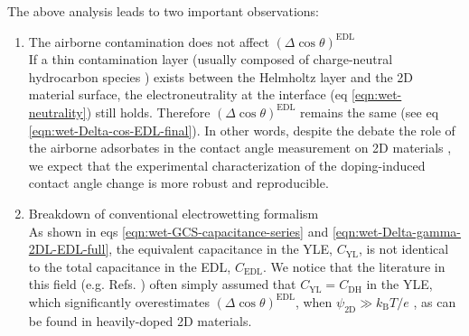 The above analysis leads to two important observations:
\begin{enumerate}
\item The airborne contamination does not affect \((\Delta \cos
  \theta)^{\mathrm{EDL}}\) \\
  If a thin
contamination layer (usually composed of charge-neutral hydrocarbon
species \cite{li_2013_airborne}) exists between the Helmholtz layer and
the 2D material surface, the electroneutrality at the interface (eq
\autoref{eqn:wet-neutrality}) still holds. Therefore \((\Delta \cos
\theta)^{\mathrm{EDL}}\) remains the same (see eq
\autoref{eqn:wet-Delta-cos-EDL-final}). In other words, despite the
debate the role of the airborne adsorbates in the contact angle
measurement on 2D materials
\cite{li_2013_airborne,Kozbial_2015_wetting_mos2,Xu_2013_withwhat,Chow_2015}, we expect
that the experimental characterization of the doping-induced contact
angle change is more robust and reproducible.

\item Breakdown of conventional electrowetting formalism \\
  As shown in eqs
\autoref{eqn:wet-GCS-capacitance-series} and \autoref{eqn:wet-Delta-gamma-2DL-EDL-full},
the equivalent capacitance in the YLE, \(C_{\mathrm{YL}}\), is not
identical to the total capacitance in the EDL, \(C_{\mathrm{EDL}}\). We
notice that the literature in this field (e.g. Refs.
\cite{Ostrowski_2014_tunable,Daub_2007_nanoscale_EW,goniszewski_correlation_2016,Ashraf_2016_doping})
often simply assumed that \(C_{\mathrm{YL}}=C_{\mathrm{DH}}\) in the
YLE, which significantly overestimates \((\Delta \cos
\theta)^{\mathrm{EDL}}\), when \(\psi_{\mathrm{2D}} \gg
k_{\mathrm{B}}T/e\) \cite{Israelachvili_2011_book}, as can be found in heavily-doped 2D materials. 
\end{enumerate}

